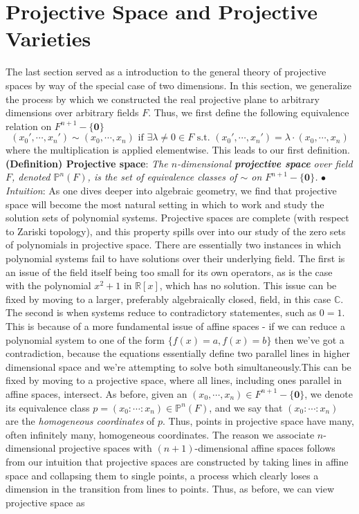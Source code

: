 \documentclass{article}
\newcommand*{\tb}{\textbf}
\newcommand*{\ti}{\textit}
\newcommand*{\n}{\newline}
\newcommand*{\nn}{\newline \newline}
\newcommand*{\In}{\indent \ensuremath{\bullet} \textit{Intuition}: }
\begin{document}
\section{Projective Space and Projective Varieties}
The last section served as a introduction to the general theory of projective spaces by way of the special case of two dimensions. In this section, we generalize the process by which we constructed the real projective plane to arbitrary dimensions over arbitrary fields $ F $. Thus, we first define the following equivalence relation on $ F^{n + 1} - \{ \mathbf{0} \} $
$$ (x_0', \cdots, x_n') \sim (x_0, \cdots, x_n) \text{ if } \exists \lambda \neq 0 \in F \text{ s.t. } (x_0', \cdots, x_n') = \lambda \cdot (x_0, \cdots, x_n) $$
where the multiplication is applied elementwise. This leads to our first definition.
\nn
\tb{(Definition) Projective space}: \ti{The $ n $-dimensional \tb{projective space} over field $ F $, denoted $ \mathbb{P}^n(F) $, is the set of equivalence classes of $ \sim $ on $ F^{n + 1} - \{ \mathbf{0} \} $.} 
\n
\In As one dives deeper into algebraic geometry, we find that projective space will become the most natural setting in which to work and study the solution sets of polynomial systems. Projective spaces are complete (with respect to Zariski topology), and this property spills over into our study of the zero sets of polynomials in projective space. There are essentially two instances in which polynomial systems fail to have solutions over their underlying field. The first is an issue of the field itself being too small for its own operators, as is the case with the polynomial $ x^2 + 1 $ in $ \mathbb{R}[x] $, which has no solution. This issue can be fixed by moving to a larger, preferably algebraically closed, field, in this case $ \mathbb{C} $. The second is when systems reduce to contradictory statementes, such as $ 0 = 1 $. This is because of a more fundamental issue of affine spaces - if we can reduce a polynomial system to one of the form $ \{ f(x) = a, f(x) = b \} $ then we've got a contradiction, because the equations essentially define two parallel lines in higher dimensional space and we're attempting to solve both simultaneously.This can be fixed by moving to a projective space, where all lines, including ones parallel in affine spaces, intersect.
\nn
As before, given an $ (x_0, \cdots, x_n) \in F^{n + 1} - \{ \mathbf{0} \} $, we denote its equivalence class $ p = (x_0 : \cdots : x_n) \in \mathbb{P}^n(F) $, and we say that $ (x_0 : \cdots : x_n) $ are the \ti{homogeneous coordinates} of $ p $. Thus, points in projective space have many, often infinitely many, homogeneous coordinates. The reason we associate $ n $-dimensional projective spaces with $ (n + 1) $-dimensional affine spaces follows from our intuition that projective spaces are constructed by taking lines in affine space and collapsing them to single points, a process which clearly loses a dimension in the transition from lines to points. Thus, as before, we can view projective space as
\end{document}
